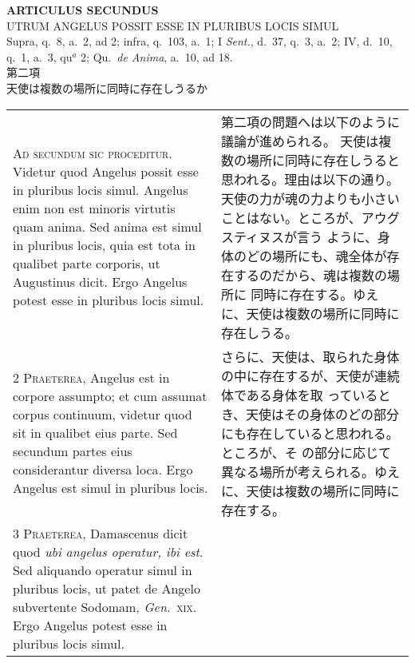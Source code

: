\documentclass[10pt]{jsarticle} %
\begin{document}
\begin{center}
 {\Large {\bf ARTICULUS SECUNDUS}}\\
 {\large UTRUM ANGELUS POSSIT ESSE IN PLURIBUS LOCIS SIMUL}\\
 {\footnotesize Supra, q.~8, a.~2, ad 2; infra, q.~103, a.~1; I
 {\itshape Sent.}, d.~37, q.~3, a.~2; IV, d.~10, q.~1, a.~3, qu$^a$ 2;
 Qu.~{\itshape de Anima}, a.~10, ad 18.}\\
 {\Large 第二項\\天使は複数の場所に同時に存在しうるか}
\end{center}

\begin{longtable}{p{21em}p{21em}}




{\huge A}{\scshape d secundum sic proceditur}. Videtur quod
Angelus possit esse in pluribus locis simul. Angelus enim non est
minoris virtutis quam anima. Sed anima est simul in pluribus locis, quia
est tota in qualibet parte corporis, ut Augustinus dicit. Ergo Angelus
potest esse in pluribus locis simul.

&


第二項の問題へは以下のように議論が進められる。
天使は複数の場所に同時に存在しうると思われる。理由は以下の通り。
天使の力が魂の力よりも小さいことはない。ところが、アウグスティヌスが言う
 ように、身体のどの場所にも、魂全体が存在するのだから、魂は複数の場所に
 同時に存在する。ゆえに、天使は複数の場所に同時に存在しうる。

\\


{\scshape 2 Praeterea}, Angelus est in corpore assumpto;
et cum assumat corpus continuum, videtur quod sit in qualibet eius
parte. Sed secundum partes eius considerantur diversa loca. Ergo Angelus
est simul in pluribus locis.

&
さらに、天使は、取られた身体の中に存在するが、天使が連続体である身体を取
っているとき、天使はその身体のどの部分にも存在していると思われる。ところが、そ
 の部分に応じて異なる場所が考えられる。ゆえに、天使は複数の場所に同時に
 存在する。

\\


{\scshape 3 Praeterea}, Damascenus dicit quod {\itshape ubi
angelus operatur, ibi est}. Sed aliquando operatur simul in pluribus
locis, ut patet de Angelo subvertente Sodomam, {\itshape Gen}.~{\scshape xix}. Ergo Angelus
potest esse in pluribus locis simul.

&


\end{longtable}
\end{document}
